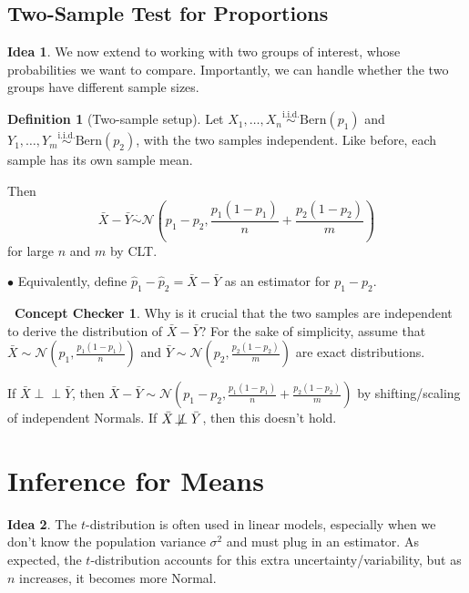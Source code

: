 \documentclass[12pt,oneside]{article}
\newcommand{\indep}{\perp\!\!\!\perp}
\newcommand{\notindep}{\mathrel{\not\!\perp\!\!\!\perp}}
\newcommand{\N}{\mathcal{N}}
\newcommand{\Bern}{\text{Bern}}
\newcommand{\simiid}{\overset{\text{i.i.d.}}{\sim}}
\newcommand{\simapprox}{\overset{\cdot}{\sim}}
\theoremstyle{definition}
\newtheorem{definition}{Definition}
\newtheorem{concept}{\faPen \ Concept Checker}
\newtheorem*{idea}{Idea}
\theoremstyle{remark}
\begin{document}
\subsection{Two-Sample Test for Proportions}

\begin{idea}
We now extend to working with two groups of interest, whose probabilities we want to compare. Importantly, we can handle whether the two groups have different sample sizes.
\end{idea}

\begin{definition}[Two-sample setup]
Let $X_{1}, \ldots, X_{n} \simiid \Bern(p_1)$ and $Y_{1}, \ldots, Y_{m} \simiid \Bern(p_2)$, with the two samples independent. Like before, each sample has its own sample mean.

Then \[\bar{X} - \bar{Y} \simapprox \N \left( p_1 - p_2, \frac{p_1(1 - p_1)}{n} + \frac{p_2(1 - p_2)}{m} \right)\] for large $n$ and $m$ by CLT.

$\bullet$ Equivalently, define $\hat{p}_1 - \hat{p}_2 = \bar{X} - \bar{Y}$ as an estimator for $p_1 - p_2$.
\end{definition}

\begin{concept}
Why is it crucial that the two samples are independent to derive the distribution of $\bar{X} - \bar{Y}$? For the sake of simplicity, assume that $\bar{X} \sim \N \left( p_1, \frac{p_1(1 - p_1)}{n} \right)$ and $\bar{Y} \sim \N \left( p_2, \frac{p_2(1 - p_2)}{m} \right)$ are exact distributions.
\end{concept}

\begin{solutionbox}
If $\bar{X} \indep \bar{Y}$, then $\bar{X} - \bar{Y} \sim \N \left( p_1 - p_2, \frac{p_1(1 - p_1)}{n} + \frac{p_2(1 - p_2)}{m} \right)$ by shifting/scaling of independent Normals. If $\bar{X} \notindep \bar{Y}$, then this doesn't hold.
\end{solutionbox}

\section{Inference for Means}

\begin{idea}
The $t$-distribution is often used in linear models, especially when we don't know the population variance $\sigma^2$ and must plug in an estimator. As expected, the $t$-distribution accounts for this extra uncertainty/variability, but as $n$ increases, it becomes more Normal.
\end{idea}
\end{document}
